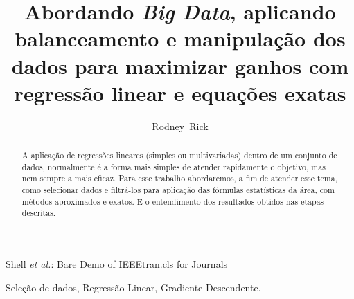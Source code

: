 \documentclass[journal]{IEEEtran}
\begin{document}
\title{\LARGE{Abordando \textit{Big Data}, aplicando balanceamento e manipulação dos dados para maximizar ganhos com regressão linear e equações exatas}}

\author{Rodney~Rick}

\markboth{\date{\today}}%
{Shell \MakeLowercase{\textit{et al.}}: Bare Demo of IEEEtran.cls for Journals}










\maketitle



\begin{abstract}
A aplicação de regressões lineares (simples ou multivariadas) dentro de um conjunto de dados, normalmente é a forma mais simples de atender rapidamente o objetivo, mas nem sempre a mais eficaz. Para esse trabalho abordaremos, a fim de atender esse tema, como selecionar dados e filtrá-los para aplicação das fórmulas estatísticas da área, com métodos aproximados e exatos. E o entendimento dos resultados obtidos nas etapas descritas.
\end{abstract}




 Seleção de dados, Regressão Linear, Gradiente Descendente.


\end{document}

